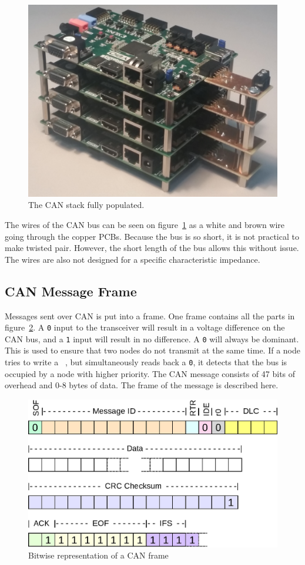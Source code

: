 \begin{figure}[H]
	\centering
	\includegraphics[width = 0.6\linewidth]{graphics/CAN_stack_picture}
	\caption{The CAN stack fully populated.}
	\label{fig:CAN_stack_picture}
\end{figure}

The wires of the CAN bus can be seen on figure~\ref{fig:CAN_stack_picture} as a white and brown wire going through the copper PCBs.
Because the bus is so short, it is not practical to make twisted pair.
However, the short length of the bus allows this without issue.
The wires are also not designed for a specific characteristic impedance.

\subsection{CAN Message Frame}\label{sub:CanMessageFrame}
Messages sent over CAN is put into a frame. 
One frame contains all the parts in figure~\ref{fig:CAN_frame_pdf}.
A \texttt{0} input to the transceiver will result in a voltage difference on the CAN bus, and a \texttt{1} input will result in no difference. 
A \texttt{0} will always be dominant.
This is used to ensure that two nodes do not transmit at the same time.
If a node tries to write a \texttt{	}, but simultaneously reads back a \texttt{0}, it detects that the bus is occupied by a node with higher priority.
The CAN message consists of 47 bits of overhead and 0-8 bytes of data. 
The frame of the message is described here.

\begin{figure}[h!]
	\centering
	\includegraphics[width = 0.9\linewidth]{graphics/CAN_frame}
	\caption{Bitwise representation of a CAN frame}
	\label{fig:CAN_frame_pdf}
\end{figure}


